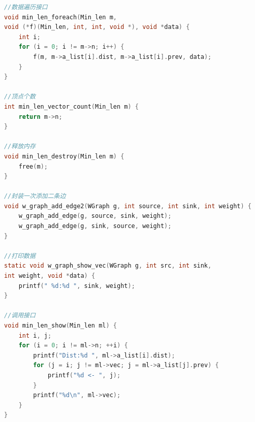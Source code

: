 \documentclass[a4paper,10pt]{ctexart}
\begin{document}
\begin{lstlisting}[language={C}]
//数据遍历接口
void min_len_foreach(Min_len m,
void (*f)(Min_len, int, int, void *), void *data) {
    int i;
    for (i = 0; i != m->n; i++) {
        f(m, m->a_list[i].dist, m->a_list[i].prev, data);
    }
}

//顶点个数
int min_len_vector_count(Min_len m) {
    return m->n;
}

//释放内存
void min_len_destroy(Min_len m) {
    free(m);
}

//封装一次添加二条边
void w_graph_add_edge2(WGraph g, int source, int sink, int weight) {
    w_graph_add_edge(g, source, sink, weight);
    w_graph_add_edge(g, sink, source, weight);
}

//打印数据
static void w_graph_show_vec(WGraph g, int src, int sink,
int weight, void *data) {
    printf(" %d:%d ", sink, weight);
}

//调用接口
void min_len_show(Min_len ml) {
    int i, j;
    for (i = 0; i != ml->n; ++i) {
        printf("Dist:%d ", ml->a_list[i].dist);
        for (j = i; j != ml->vec; j = ml->a_list[j].prev) {
            printf("%d <- ", j);
        }
        printf("%d\n", ml->vec);
    }
}
\end{lstlisting}
\end{document}
